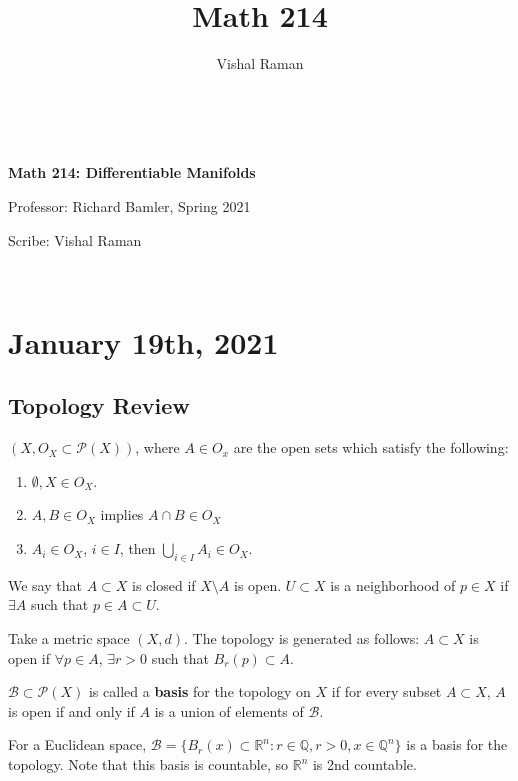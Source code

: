 \documentclass[12pt]{scrartcl}
\newcommand{\Q}{\mathbb{Q}}
\newcommand{\R}{\mathbb{R}}
\let \mc \mathcal
\begin{document}
\title{Math 214}
\author{Vishal Raman}
\thispagestyle{empty}
$ $
\vfill
\begin{center}

\centerline{\huge \textbf{Math 214: Differentiable Manifolds} } 
\centerline{Professor: Richard Bamler, Spring 2021}
\centerline{Scribe: Vishal Raman}
\end{center}
\vfill
$ $
\newpage
\thispagestyle{empty}
\tableofcontents
\newpage
\section{January 19th, 2021}
\subsection{Topology Review}
\begin{definition} $(X, O_X \subset \mc P(X))$, where $A \in O_x$ are the open sets which satisfy the following:
\begin{enumerate}
\item $\emptyset, X \in O_X$.
\item $A, B \in O_X$ implies $A \cap B \in O_X$
\item $A_i \in O_X$, $i \in I$, then $\bigcup_{i \in I} A_i \in O_X$.
\end{enumerate}
We say that $A \subset X$ is closed if $X \setminus A$ is open.  $U \subset X$ is a neighborhood of $p \in X$ if $\exists A$ such that $p \in A \subset U$.
\end{definition}

\begin{example} Take a metric space $(X, d)$.  The topology is generated as follows: $A \subset X$ is open if $\forall p \in A$, $\exists r > 0$ such that $B_r(p) \subset A$.
\end{example}

\begin{definition}  $\mc B \subset \mc P(X)$ is called a \textbf{basis} for the topology on $X$ if for every subset $A \subset X$, $A$ is open if and only if $A$ is a union of elements of $\mc B$.
\end{definition}
\begin{example} For a Euclidean space, $\mc B = \{B_r(x) \subset \R^n: r \in \Q, r > 0, x \in \Q^n\}$ is a basis for the topology.  Note that this basis is countable, so $\R^n$ is 2nd countable.  
\end{example}
\end{document}
